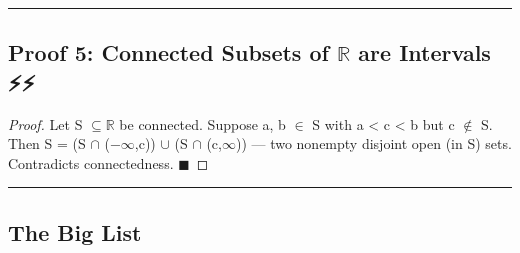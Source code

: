 \documentclass[12pt,a4paper,openany]{book}
\begin{document}
{{\bigskip\noindent\rule{\textwidth}{0.4pt}\bigskip

\subsection{Proof 5: Connected Subsets of $\mathbb{R}$ are Intervals ⚡⚡}

\begin{proof}

Let S $\subseteq\mathbb{R}$ be connected. Suppose a, b $\in$ S with a < c < b but c $\notin$ S.
Then S = (S $\cap$ (−$\infty$,c)) $\cup$ (S $\cap$ (c,$\infty$)) — two nonempty disjoint open (in S) sets. Contradicts connectedness. $\blacksquare$
\end{proof}

\bigskip\noindent\rule{\textwidth}{0.4pt}\bigskip


\subsection{The Big List}

}}
\end{document}
